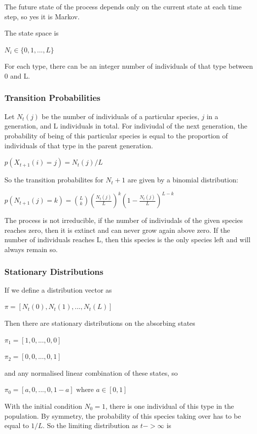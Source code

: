 \documentclass{article}
\begin{document}
The future state of the process depends only on the current state at each time step, so yes it is Markov. 

The state space is 

$N_i \in \{0,1,...,L\} $ 

For each type, there can be an integer number of individuals of that type between 0 and L. 

\subsubsection{Transition Probabilities}

Let $N_t(j)$ be the number of individuals of a particular species, $j$ in a generation, and L individuals in total. For indiviudal of the next generation, the probability of being of this particular species is equal to the proportion of individuals of that type in the parent generation. 

$p(X_{t+1}(i) = j) = N_t(j)/L$

So the transition probabilites for $N_t+1$ are given by a binomial distribution:

$p(N_{t+1}(j) = k) = {L \choose k}(\frac{N_t(j)}{L})^k(1-\frac{N_t(j)}{L})^{L-k}$

The process is not irreducible, if the number of indiviudals of the given species reaches zero, then it is extinct and can never grow again above zero. If the number of individuals reaches L, then this species is the only species left and will always remain so. 

\subsubsection{Stationary Distributions}

If we define a distribution vector as

$\pi = [N_t(0), N_t(1),...,N_t(L)]$

Then there are stationary distributions on the absorbing states

$\pi_1 = [1, 0,...,0,0]$

$\pi_2 = [0, 0,...,0,1]$

and any normalised linear combination of these states, so

$\pi_0 = [a, 0,...,0,1-a] \text{ where } a \in [0,1]$ 

With the initial condition $N_0 = 1$, there is one individual of this type in the population. By symmetry, the probability of this species taking over has to be equal to $1/L$. So the limiting distribution as $t -> \infty$ is
\end{document}
